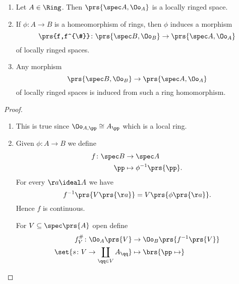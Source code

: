 \documentclass[10pt,a4paper,twoside,openany,hidelinks]{book}
\begin{document}
\begin{proposition}
\begin{enumerate}
\item Let $A \in \Ring$. Then $\prs{\spec A, \Oo_A}$ is a locally ringed space.
\item If $\phi \colon A \to B$ is a homeomorphism of rings, then $\phi$ induces a morphism \[\prs{f,f^{\#}} \colon \prs{\spec B, \Oo_B} \to \prs{\spec A, \Oo_A}\]
of locally ringed spaces.
\item Any morphism
\[\prs{\spec B, \Oo_B} \to \prs{\spec A, \Oo_A}\]
of locally ringed spaces is induced from such a ring homomorphism.
\end{enumerate}
\end{proposition}

\begin{proof}
\begin{enumerate}
\item This is true since $\Oo_{A, \pp} \cong A_\pp$ which is a local ring.
\item Given $\phi \colon A \to B$ we define
\begin{align*}
f \colon \spec B &\to \spec A \\
\pp &\mapsto \phi^{-1}\prs{\pp} \text{.}
\end{align*}
For every $\aa \ideal A$ we have \[f^{-1}\prs{V\prs{\aa}} = V\prs{\phi\prs{\aa}} \text{.}\]
Hence $f$ is continuous.

For $V \subseteq \spec\prs{A}$ open define
\begin{align*}
f_V^{\#} \colon \Oo_A\prs{V} &\to \Oo_B\prs{f^{-1}\prs{V}} \\
\set{s \colon V \to \coprod_{\qq \in V} A_\qq} &\mapsto \brs{\pp \mapsto }
\end{align*}
\end{enumerate}
\end{proof}

\backmatter
\end{document}
